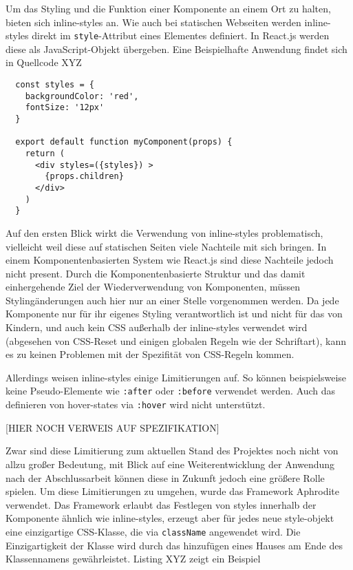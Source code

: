 Um das Styling und die Funktion einer Komponente an einem Ort zu halten, bieten sich inline-styles an. Wie auch bei statischen Webseiten werden inline-styles direkt im \verb|style|-Attribut eines Elementes definiert. In React.js werden diese als JavaScript-Objekt übergeben. Eine Beispielhafte Anwendung findet sich in Quellcode XYZ

\begin{lstlisting}
  const styles = {
    backgroundColor: 'red',
    fontSize: '12px'
  }

  export default function myComponent(props) {
    return (
      <div styles=({styles}) >
  		{props.children}
  	  </div>
    )
  }
\end{lstlisting}

Auf den ersten Blick wirkt die Verwendung von inline-styles problematisch, vielleicht weil diese auf statischen Seiten viele Nachteile mit sich bringen. In einem Komponentenbasierten System wie React.js sind diese Nachteile jedoch nicht present. Durch die Komponentenbasierte Struktur und das damit einhergehende Ziel der Wiederverwendung von Komponenten, müssen Stylingänderungen auch hier nur an einer Stelle vorgenommen werden. Da jede Komponente nur für ihr eigenes Styling verantwortlich ist und nicht für das von Kindern, und auch kein CSS außerhalb der inline-styles verwendet wird (abgesehen von CSS-Reset und einigen globalen Regeln wie der Schriftart), kann es zu keinen Problemen mit der Spezifität von CSS-Regeln kommen.

Allerdings weisen inline-styles einige Limitierungen auf. So können beispielsweise keine Pseudo-Elemente wie \verb|:after| oder \verb|:before| verwendet werden. Auch das definieren von hover-states via \verb|:hover| wird nicht unterstützt.

[HIER NOCH VERWEIS AUF SPEZIFIKATION]

Zwar sind diese Limitierung zum aktuellen Stand des Projektes noch nicht von allzu großer Bedeutung, mit Blick auf eine Weiterentwicklung der Anwendung nach der Abschlussarbeit können diese in Zukunft jedoch eine größere Rolle spielen.
Um diese  Limitierungen zu umgehen, wurde das Framework Aphrodite verwendet. Das Framework erlaubt das Festlegen von styles innerhalb der Komponente ähnlich wie inline-styles, erzeugt aber für jedes neue style-objekt eine einzigartige CSS-Klasse, die via \verb|className| angewendet wird. Die Einzigartigkeit der Klasse wird durch das hinzufügen eines Hauses am Ende des Klassennamens gewährleistet.  Listing XYZ zeigt ein Beispiel

